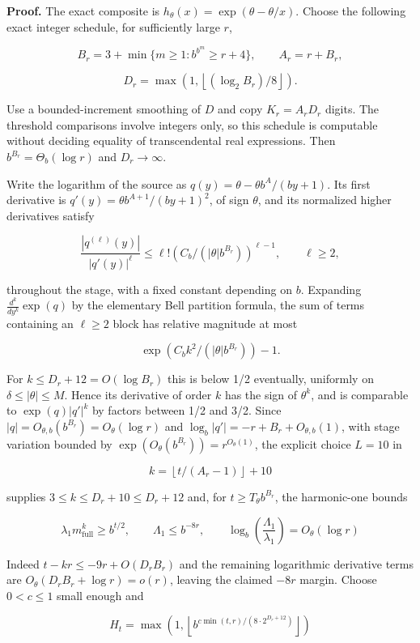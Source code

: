\documentclass[11pt,a4paper]{article}
\begin{document}
\textbf{Proof.} The exact composite is
\(h_\theta(x)=\exp(\theta-\theta/x)\). Choose the following exact
integer schedule, for sufficiently large \(r\),

\[
B_r=3+\min\lbrace m\ge 1: b^{b^m}\ge r+4\rbrace ,\qquad A_r=r+B_r,
\]

\[
D_r=\max(1,\left\lfloor (\log_2 B_r)/8\right\rfloor).
\]

Use a bounded-increment smoothing of \(D\) and copy \(K_r=A_rD_r\)
digits. The threshold comparisons involve integers only, so this
schedule is computable without deciding equality of transcendental real
expressions. Then \(b^{B_r}=\Theta_b(\log r)\) and \(D_r\to \infty\).

Write the logarithm of the source as \(q(y)=\theta-\theta b^A/(by+1)\).
Its first derivative is \(q'(y)=\theta b^{A+1}/(by+1)^2\), of sign
\(\theta\), and its normalized higher derivatives satisfy

\[
\frac{|q^{(\ell)}(y)|}{|q'(y)|^\ell} \le  \ell! (C_b/(|\theta| b^{B_r}))^{\ell-1},\qquad \ell\ge 2,
\]

throughout the stage, with a fixed constant depending on \(b\).
Expanding \(\frac{d^k}{dy^k}\exp(q)\) by the elementary Bell partition
formula, the sum of terms containing an \(\ell\ge 2\) block has relative
magnitude at most

\[
\exp(C_b k^2/(|\theta|b^{B_r}))-1.\tag{6.1}
\]

For \(k\le D_r+12=O(\log B_r)\) this is below 1/2 eventually, uniformly
on \(\delta\le |\theta|\le M\). Hence its derivative of order \(k\) has
the sign of \(\theta^k\), and is comparable to \(\exp(q)|q'|^k\) by
factors between 1/2 and 3/2. Since
\(|q|=O_{\theta,b}(b^{B_r})=O_\theta(\log r)\) and
\(\log_b |q'|=-r+B_r+O_{\theta,b}(1)\), with stage variation bounded by
\(\exp(O_\theta(b^{B_r}))=r^{O_\theta(1)}\), the explicit choice
\(L=10\) in

\[
k=\left\lfloor t/(A_r-1)\right\rfloor+10
\]

supplies \(3\le k\le D_r+10\le D_r+12\) and, for
\(t\ge T_\theta b^{B_r}\), the harmonic-one bounds

\[
\lambda_1 m_{\mathrm{full}}^k \ge  b^{t/2},\qquad \Lambda_1\le b^{-8r},\qquad
\log_b(\frac{\Lambda_1}{\lambda_1})=O_\theta(\log r)
\]

Indeed \(t-k r\le -9r+O(D_r B_r)\) and the remaining logarithmic
derivative terms are \(O_\theta(D_r B_r+\log r)=o(r)\), leaving the
claimed \(-8r\) margin. Choose \(0< c\le 1\) small enough and

\[
H_t=\max(1,\left\lfloor b^{c \min(t,r)/(8\cdot 2^{D_r+12})}\right\rfloor)
\]
\end{document}
